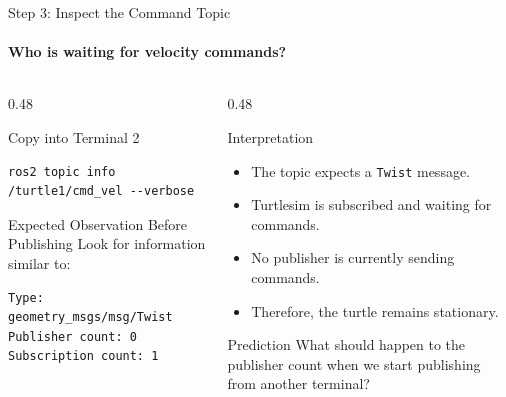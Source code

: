 \begin{frame}[fragile]{Step 3: Inspect the Command Topic}
\framesubtitle{Who is waiting for velocity commands?}

\footnotesize

\begin{columns}[T,onlytextwidth]

    \begin{column}{0.48\textwidth}
        \begin{block}{Copy into Terminal 2}
\begin{verbatim}
ros2 topic info /turtle1/cmd_vel --verbose
\end{verbatim}
        \end{block}

        \begin{exampleblock}{Expected Observation Before Publishing}
            Look for information similar to:
\begin{verbatim}
Type: geometry_msgs/msg/Twist
Publisher count: 0
Subscription count: 1
\end{verbatim}
        \end{exampleblock}
    \end{column}

    \begin{column}{0.48\textwidth}
        \begin{block}{Interpretation}
            \begin{itemize}
                \setlength{\itemsep}{0.25em}
                \item The topic expects a \texttt{Twist} message.
                \item Turtlesim is subscribed and waiting for commands.
                \item No publisher is currently sending commands.
                \item Therefore, the turtle remains stationary.
            \end{itemize}
        \end{block}

        \vspace{0.15cm}

        \begin{alertblock}{Prediction}
            What should happen to the publisher count when we start publishing
            from another terminal?
        \end{alertblock}
    \end{column}

\end{columns}

\end{frame}

